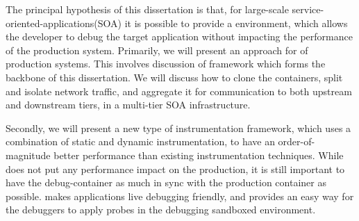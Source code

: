 
The principal hypothesis of this dissertation is that, for large-scale service-oriented-applications(SOA) it is possible to provide a \livedebugging environment, which allows the developer to debug the target application without impacting the performance of the production system.
Primarily, we will present an approach for \livedebugging of production systems.
This involves discussion of \parikshan framework which forms the backbone of this dissertation.
We will discuss how to clone the containers, split and isolate network traffic, and aggregate it for communication to both upstream and downstream tiers, in a multi-tier SOA infrastructure.

Secondly, we will present \iprobe a new type of instrumentation framework, which uses a combination of static and dynamic instrumentation, to have an order-of-magnitude better performance than existing instrumentation techniques. 
While \livedebugging does not put any performance impact on the production, it is still important to have the debug-container as much in sync with the production container as possible. 
\iprobe makes applications live debugging friendly, and provides an easy way for the debuggers to apply probes in the debugging sandboxed environment.

